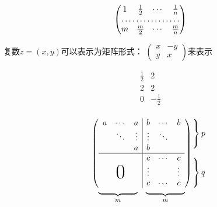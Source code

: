 \documentclass{article}
\begin{document}
    \[
    \begin{pmatrix}
        1 & \frac{1}{2} & \cdots & \frac{1}{n} \\
        \hdotsfor{4} \\
        m & \frac{m}{2} & \cdots & \frac{m}{n}
    \end{pmatrix}    
    \]

    复数$z = (x,y)$可以表示为矩阵形式：
    \begin{math}
        \left(
            \begin{smallmatrix}
                x & -y \\ y & x
            \end{smallmatrix}
        \right)
    \end{math}来表示

    \[
    \begin{array}{c|c}
        \frac{1}{2} & 2 \\
        \hline
        2 & 2 \\
        \hline 
        0 & -\frac{1}{2} \\
    \end{array}
    \]
    
    \[
    \begin{array}{c@{\hspace{-5pt}}l}
    \left(
    \begin{array}{ccc|ccc}
        a & \cdots & a & b & \cdots & b \\
        & \ddots & \vdots & \vdots & \ddots \\
        & & a & b \\
        \hline
        & & & c & \cdots & c \\
        & & & \vdots & & \vdots \\
        \multicolumn{3}{c|}{\raisebox{2ex}[0pt]{\Huge 0}} 
        & c & \cdots & c \\
    \end{array}
    \right)
    &
    \begin{array}{l}
    \left.\rule{0mm}{7mm}\right\}p\\    
    \\
    \left.\rule{0mm }{7mm}\right\}q
    \end{array}
    \\[-5pt]
    \begin{array}{cc}
    \underbrace{\rule{17mm}{0mm}}_m &
    \underbrace{\rule{17mm}{0mm}}_m
    \end{array}
    & 
    \end{array}
    \]
\end{document}
